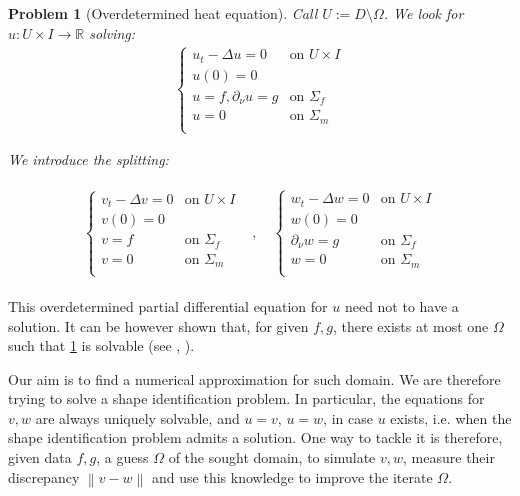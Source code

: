 \documentclass[english,a4paper,9pt,oneside]{scrbook}	%
\theoremstyle{break}
\newtheorem{pb}[equation]{Problem}
\theoremstyle{remark}
\newcommand{\mR}{\mathbb{R}}
\newcommand{\norm}[1]{\left\lVert#1\right\rVert}
\begin{document}
\begin{pb}[Overdetermined heat equation]
\label{pb:pdes}
Call $U:=D\setminus \Omega$. We look for $u:U \times I \rightarrow \mR$ solving:
\begin{align*}
\left\{\begin{matrix}
u_t -\Delta u=0 & \text{on }U\times I \\ 
u(0)=0 & \\ 
u = f, \partial_\nu u=g & \text{on }\Sigma_f\\
u = 0 & \text{on }\Sigma_m\\
\end{matrix}\right.
\end{align*}

We introduce the splitting:

\begin{align*}
\begin{matrix}
\left\{\begin{matrix}
v_t -\Delta v=0 & \text{on }U\times I \\ 
v(0)=0 & \\ 
v = f& \text{on }\Sigma_f\\
v = 0 & \text{on }\Sigma_m\\
\end{matrix}\right. &, \quad  \left\{\begin{matrix}
w_t -\Delta w=0 & \text{on }U\times I \\ 
w(0)=0 & \\ 
\partial_\nu w=g & \text{on }\Sigma_f\\
w = 0 & \text{on }\Sigma_m\\
\end{matrix}\right.
\end{matrix}
\end{align*}
\end{pb}

This overdetermined partial differential equation for $u$ need not to have a solution. It can be however shown that, for given $f,g$, there exists at most one $\Omega$ such that \cref{pb:pdes} is solvable (see \cite{chapko1}, \cite{chapko2}).

Our aim is to find a numerical approximation for such domain. We are therefore trying to solve a shape identification problem. In particular, the equations for $v,w$ are always uniquely solvable, and $u=v$, $u=w$, in case $u$ exists, i.e. when the shape identification problem admits a solution. One way to tackle it is therefore, given data $f,g$, a guess $\Omega$ of the sought domain, to simulate $v,w$, measure their discrepancy $\norm{v-w}$ and use this knowledge to improve the iterate $\Omega$.
\end{document}

